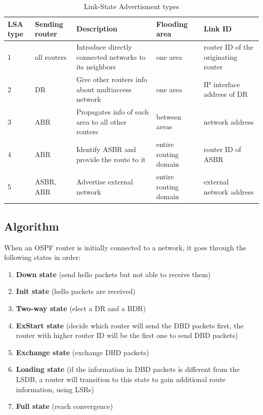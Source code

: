 \begin{table}[h]
\centering
\caption{Link-State Advertisment types}
\label{LSA-type}
\begin{tabular}{@{} p{2em} p{3em} p{10em} p{7em} p{9em} @{}}
\toprule
LSA type & Sending router & Description                                            & Flooding area        & Link ID                             \\ \midrule
1        & all routers    & Introduce directly connected networks to its neighbors & one area             & router ID of the originating router \\
2        & DR             & Give other routers info about multiaccess network      & one area             & IP interface address of DR		\\
3        & ABR            & Propagates info of each area to all other routers      & between areas        & network address                 \\ 
4        & ABR            & Identify ASBR and provide the route to it              & entire routing domain& router ID of ASBR                 \\ 
5        & ASBR, ABR      & Advertise external network                             & entire routing domain& external network address         \\ \bottomrule
\end{tabular}
\end{table}

\subsection{Algorithm}\label{sec:algorithm}
When an OSPF router is initially connected to a network, it goes through the following states in order:
\begin{enumerate}
	\item \textbf{Down state} (send hello packets but not able to receive them)
	\item \textbf{Init state} (hello packets are received)
	\item \textbf{Two-way state} (elect a DR and a BDR)
	\item \textbf{ExStart state} (decide which router will send the DBD packets first, the router with higher router ID will be the first one to send DBD packets)%
	\item \textbf{Exchange state} (exchange DBD packets)
	\item \textbf{Loading state} (if the information in DBD packets is different from the LSDB, a router will transition to this state to gain additional route information, using LSRs)
	\item \textbf{Full state} (reach convergence)
\end{enumerate}


